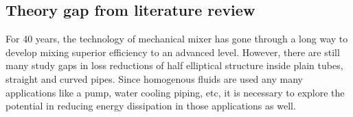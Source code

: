 \subsection{Theory gap from literature review}
For 40 years, the technology of mechanical mixer has gone through a long way to develop mixing superior efficiency to an advanced level. However, there are still many study gaps in loss reductions of half elliptical structure inside plain tubes, straight and curved pipes. Since homogenous fluids are used any many applications like a pump, water cooling piping, etc, it is necessary to explore the potential in reducing energy dissipation in those applications as well.  
\clearpage %
